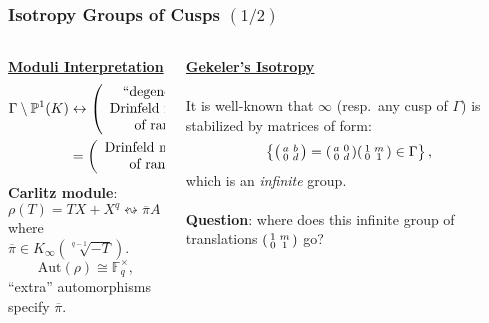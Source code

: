 \documentclass[handout]{beamer}
\numberwithin{equation}{section}
\numberwithin{case}{theorem}
\newcommand{\bbF}{\mathbb{F}}		%
\newcommand{\bbP}{\mathbb{P}}		%
\newcommand{\Aut}{\mathrm{Aut}} 	%
\newcommand{\<}{\left\langle}
\renewcommand{\>}{\right\rangle}
\begin{document}
	\begin{frame}
		\frametitle{Isotropy Groups of Cusps $(1/2)$}
		\begin{columns}
			\begin{column}{.5\textwidth}
				\underline{\textbf{Moduli Interpretation}}
				\begin{align*}
					\Gamma\setminus\bbP^1(K)&\leftrightarrow\left(\begin{array}{c}\text{``degenerate''}\\\text{Drinfeld modules}\\\text{of rank }$2$\end{array}\right),\\
					&=\left(\begin{array}{c}\text{Drinfeld modules}\\\text{of rank }$1$\end{array}\right)
				\end{align*}
				\pause
				\textbf{Carlitz module}: \[\rho(T)=TX+X^q \leftrightsquigarrow \overline{\pi}A\subset \Omega,\] \pause
				where $\overline{\pi}\in K_{\infty}(\sqrt[q-1]{-T}).$ \pause \\
				\[\Aut(\rho)\cong \bbF_q^{\times},\] \pause %
				``extra'' automorphisms specify $\overline{\pi}.$
			\end{column}
			\begin{column}{.5\textwidth}
				\underline{\textbf{Gekeler's Isotropy}}\\$~$\\
				It is well-known that $\infty$ (resp.\ any cusp of $\Gamma$) is stabilized by matrices of form:
				\[\left\{\begin{psmallmatrix}a&b\\0&d\end{psmallmatrix} = 
				\begin{psmallmatrix}a&0\\0&d\end{psmallmatrix}\begin{psmallmatrix}1&m\\0&1\end{psmallmatrix} \in \Gamma \right\},\] which is an \emph{infinite} group. \pause \\$~$\\ 
				
				\textbf{Question}: where does this infinite group of translations $\begin{psmallmatrix}1&m\\0&1\end{psmallmatrix}$ go? 
			\end{column}
		\end{columns}
	\end{frame}
	
\end{document}
